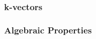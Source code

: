 \subsubsection{k-vectors}


\subsubsection{Algebraic Properties}


\begin{comment}

resources:
https://en.wikipedia.org/wiki/Exterior_algebra
https://de.wikipedia.org/wiki/Gra%

https://math.wikia.org/wiki/Dot_product
https://math.wikia.org/wiki/Wedge_product
https://math.wikia.org/wiki/Cross_product
https://math.wikia.org/wiki/Pseudovector
https://math.wikia.org/wiki/Scalar_triple_product
https://math.wikia.org/wiki/Vector_triple_product

https://en.wikipedia.org/wiki/Graded_vector_space

\end{comment}